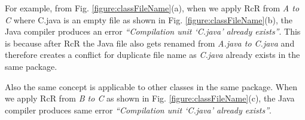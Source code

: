 For example, from Fig. \ref{figure:classFileName}(a), when we apply RcR from \emph{A to C} where C.java is an empty file as shown in Fig. \ref{figure:classFileName}(b), the Java compiler produces an error \textit{``Compilation unit `C.java' already exists''}. This is because after RcR the Java file also gets renamed from \emph{A.java to C.java} and therefore creates a conflict for duplicate file name as \emph{C.java} already exists in the same package. 

Also the same concept is applicable to other classes in the same package. When we apply RcR from \emph{B to C} as shown in Fig. \ref{figure:classFileName}(c), the Java compiler produces same error \textit{``Compilation unit `C.java' already exists''}.  



